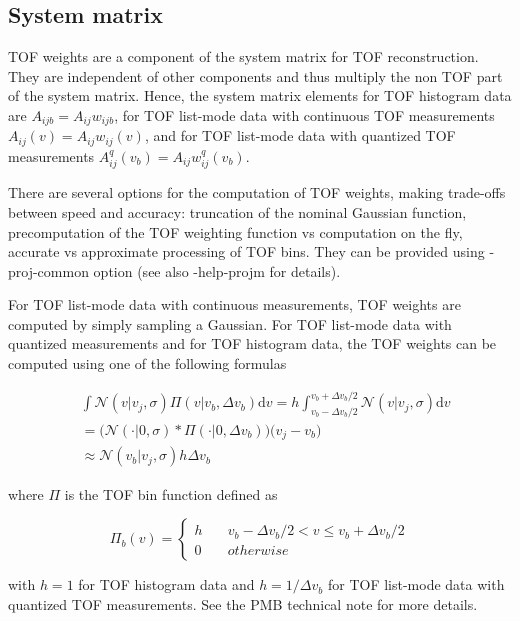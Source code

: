 \documentclass[a4paper, 11pt]{article}
\begin{document}
\subsection{System matrix}

TOF weights are a component of the system matrix for TOF reconstruction. They are independent of other components and thus multiply the non TOF part of the system matrix. Hence, the system matrix elements for TOF histogram data are $A_{ijb}=A_{ij}w_{ijb}$, for TOF list-mode data with continuous TOF measurements $A_{ij}(v)=A_{ij}w_{ij}(v)$, and for TOF list-mode data with quantized TOF measurements $A^q_{ij}(v_b)=A_{ij}w^q_{ij}(v_b)$.

There are several options for the computation of TOF weights, making trade-offs between speed and accuracy: truncation of the nominal Gaussian function, precomputation of the TOF weighting function vs computation on the fly, accurate vs approximate processing of TOF bins. They can be provided using -proj-common option (see also -help-projm for details).

For TOF list-mode data with continuous measurements, TOF weights are computed by simply sampling a Gaussian.
For TOF list-mode data with quantized measurements and for TOF histogram data, the TOF weights can be computed using one of the following formulas

\begin{align}
&\int \mathcal{N}(v|v_{j},\sigma)\Pi(v|v_b, \Delta v_b)\mathrm{d}v=h\int_{v_b-\Delta v_b/2}^{v_b+\Delta v_b/2} \mathcal{N}(v|v_{j},\sigma)\mathrm{d}v
\label{w_bin_int}\\
&=\Big(\mathcal{N}(\cdot|0,\sigma) \ast \Pi(\cdot|0, \Delta v_b)\Big)\Big(v_j-v_b\Big)
\label{w_bin_conv}\\
&\approx \mathcal{N}(v_b|v_{j},\sigma)h\Delta v_b \label{w_bin_approx}
\end{align}

where $\Pi$ is the TOF bin function defined as

\begin{equation}
\Pi_b(v)=
\begin{cases}
h &  \quad  v_b-\Delta v_b/2 < v \leq v_b+\Delta v_b/2 \\
0& \quad otherwise
\label{tof_bin}
\end{cases}
\end{equation}

with $h=1$ for TOF histogram data and $h=1/\Delta v_b$ for TOF list-mode data with quantized TOF measurements. See the PMB technical note for more details.
\end{document}
